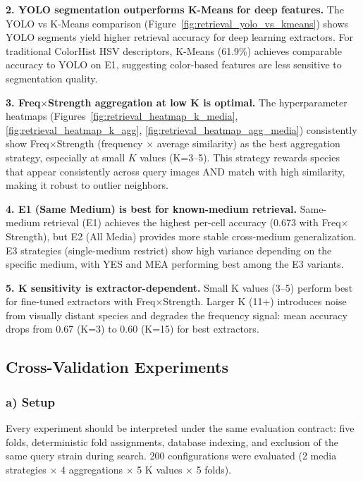 \textbf{2. YOLO segmentation outperforms K-Means for deep features.} The YOLO vs K-Means comparison (Figure~\ref{fig:retrieval_yolo_vs_kmeans}) shows YOLO segments yield higher retrieval accuracy for deep learning extractors. For traditional ColorHist HSV descriptors, K-Means (61.9\%) achieves comparable accuracy to YOLO on E1, suggesting color-based features are less sensitive to segmentation quality.

\textbf{3. Freq$\times$Strength aggregation at low K is optimal.} The hyperparameter heatmaps (Figures~\ref{fig:retrieval_heatmap_k_media}, \ref{fig:retrieval_heatmap_k_agg}, \ref{fig:retrieval_heatmap_agg_media}) consistently show Freq$\times$Strength (frequency $\times$ average similarity) as the best aggregation strategy, especially at small $K$ values (K=3--5). This strategy rewards species that appear consistently across query images AND match with high similarity, making it robust to outlier neighbors.

\textbf{4. E1 (Same Medium) is best for known-medium retrieval.} Same-medium retrieval (E1) achieves the highest per-cell accuracy (0.673 with Freq$\times$Strength), but E2 (All Media) provides more stable cross-medium generalization. E3 strategies (single-medium restrict) show high variance depending on the specific medium, with YES and MEA performing best among the E3 variants.

\textbf{5. K sensitivity is extractor-dependent.} Small K values (3--5) perform best for fine-tuned extractors with Freq$\times$Strength. Larger K (11+) introduces noise from visually distant species and degrades the frequency signal: mean accuracy drops from 0.67 (K=3) to 0.60 (K=15) for best extractors.

\subsection{Cross-Validation Experiments}\label{cross-validation-experiments}

\subsubsection{a) Setup}

Every experiment should be interpreted under the same evaluation contract: five folds, deterministic fold assignments, database indexing, and exclusion of the same query strain during search. 200 configurations were evaluated (2 media strategies $\times$ 4 aggregations $\times$ 5 K values $\times$ 5 folds).

